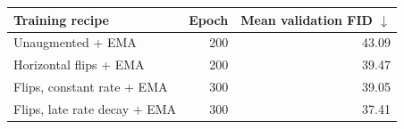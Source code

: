 \begin{tabular}{lrr}
\toprule
Training recipe & Epoch & Mean validation FID $\downarrow$ \\
\midrule
Unaugmented + EMA & 200 & 43.09 \\
Horizontal flips + EMA & 200 & 39.47 \\
Flips, constant rate + EMA & 300 & 39.05 \\
Flips, late rate decay + EMA & 300 & 37.41 \\
\bottomrule
\end{tabular}
